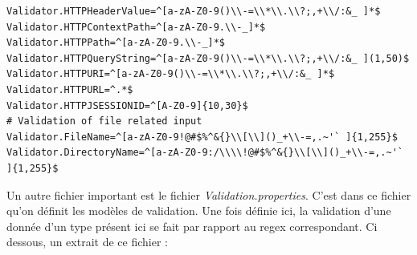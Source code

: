 \begin{lstlisting}
Validator.HTTPHeaderValue=^[a-zA-Z0-9()\\-=\\*\\.\\?;,+\\/:&_ ]*$
Validator.HTTPContextPath=^[a-zA-Z0-9.\\-_]*$
Validator.HTTPPath=^[a-zA-Z0-9.\\-_]*$
Validator.HTTPQueryString=^[a-zA-Z0-9()\\-=\\*\\.\\?;,+\\/:&_ ](1,50)$
Validator.HTTPURI=^[a-zA-Z0-9()\\-=\\*\\.\\?;,+\\/:&_ ]*$
Validator.HTTPURL=^.*$
Validator.HTTPJSESSIONID=^[A-Z0-9]{10,30}$
# Validation of file related input
Validator.FileName=^[a-zA-Z0-9!@#$%^&{}\\[\\]()_+\\-=,.~'` ]{1,255}$
Validator.DirectoryName=^[a-zA-Z0-9:/\\\\!@#$%^&{}\\[\\]()_+\\-=,.~'` ]{1,255}$
\end{lstlisting}
Un autre fichier important est le fichier \textit{Validation.properties}. C'est dans ce fichier qu'on définit les modèles de validation. Une fois définie ici, la validation d'une donnée d'un type présent ici se fait par rapport au regex correspondant. Ci dessous, un extrait de ce fichier :
